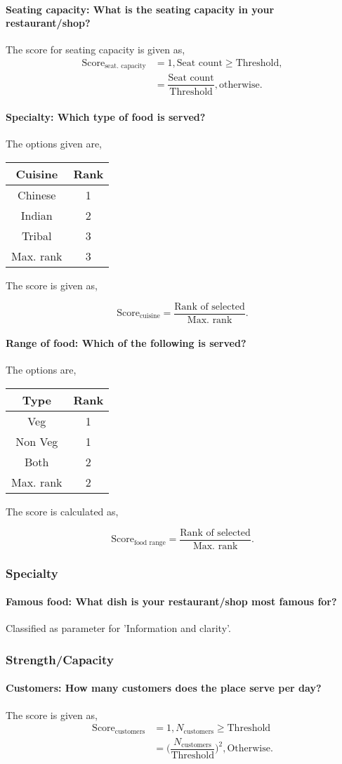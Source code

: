 \documentclass[oneside,twocolumn]{article}
\newcommand{\tsub}[2]{\text{#1}_{\text{#2}}}
\newcommand{\tsubb}[2]{#1_{\text{#2}}}
\newcommand{\dsub}[2]{\dfrac{\text{#1}}{\text{#2}}}
\newcommand{\singsel}[1]
{
	\[
		\tsub{Score}{#1} = \dsub{Rank of selected}{Max. rank}.
	\]
}
\newenvironment{ttable}
{
\begin{center}
\begin{tabular}{c|c}
\hline
}
{
\\ \hline
\end{tabular}
\end{center}
}
\begin{document}
\paragraph{Seating capacity: What is the seating capacity in your restaurant/shop?}
The score for seating capacity is given as,
\begin{align*}
	\tsub{Score}{seat. capacity} &= 1, \text{Seat count} \ge \text{Threshold}, \\
	&= \dsub{Seat count}{Threshold}, \text{otherwise}.
\end{align*}
\paragraph{Specialty: Which type of food is served?}
The options given are,
\begin{ttable}
	Cuisine & Rank \\ \hline
	Chinese & 1 \\
	Indian & 2 \\
	Tribal & 3 \\ \hline
	Max. rank & 3
\end{ttable}
The score is given as,
\singsel{cuisine}
\paragraph{Range of food: Which of the following is served?}
The options are,
\begin{ttable}
	Type & Rank \\ \hline
	Veg & 1 \\
	Non Veg & 1 \\
	Both & 2 \\ \hline
	Max. rank & 2
\end{ttable}
The score is calculated as,
\singsel{food range}

\subsubsection{Specialty}
\paragraph{Famous food: What dish is your restaurant/shop most famous for?}
Classified as parameter for 'Information and clarity'.
\subsubsection{Strength/Capacity}
\paragraph{Customers: How many customers does the place serve per day?}
The score is given as,
\begin{align*}
	\tsub{Score}{customers} &= 1, \tsubb{N}{customers} \ge \text{Threshold} \\
	&= \Big( \dfrac{\tsubb{N}{customers}}{\text{Threshold}} \Big)^{2}, \text{Otherwise}.
\end{align*}
\end{document}
